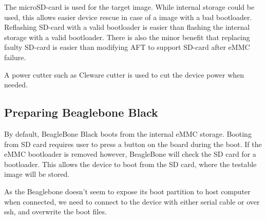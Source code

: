 \documentclass[a4paper,11pt]{article}
\begin{document}
The microSD-card is used for the target image. While internal storage could be used, this allows easier device rescue in case of a image with a bad bootloader. Reflashing SD-card with a valid bootloader is easier than flashing the internal storage with a valid bootloader. There is also the minor benefit that replacing faulty SD-card is easier than modifying AFT to support SD-card after eMMC failure.

A power cutter such as Cleware cutter is used to cut the device power when needed.

\subsection{Preparing Beaglebone Black}

By default, BeagleBone Black boots from the internal eMMC storage. Booting from SD card requires user to press a button on the board during the boot. If the eMMC bootloader is removed however, BeagleBone will check the SD card for a bootloader. This allows the device to boot from the SD card, where the testable image will be stored.

As the Beaglebone doesn't seem to expose its boot partition to host computer when connected, we need to connect to the device with either serial cable or over ssh, and overwrite the boot files.
\end{document}
